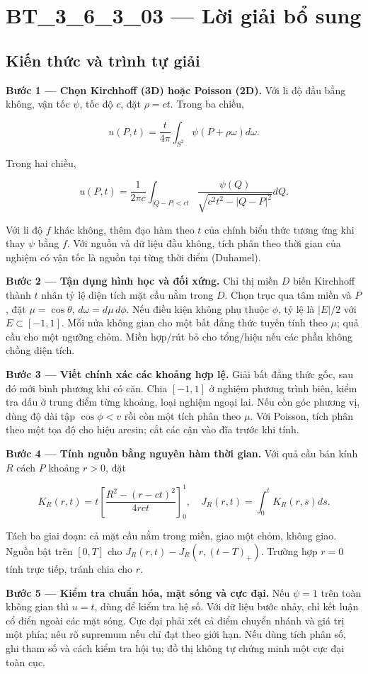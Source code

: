 \documentclass[10pt,a4paper]{article}
\begin{document}
\section*{BT\_3\_6\_3\_03 — Lời giải bổ sung}
\subsection*{Kiến thức và trình tự giải}
\textbf{Bước 1 — Chọn Kirchhoff (3D) hoặc Poisson (2D).} Với li độ đầu bằng không, vận tốc $\psi$, tốc độ $c$, đặt $\rho=ct$. Trong ba chiều,


\[
u(P,t)=\frac t{4\pi}\int_{S^2}\psi(P+\rho\omega)d\omega.
\]


Trong hai chiều,


\[
u(P,t)=\frac1{2\pi c}\int_{|Q-P|<ct}\frac{\psi(Q)}{\sqrt{c^2t^2-|Q-P|^2}}dQ.
\]


Với li độ $f$ khác không, thêm đạo hàm theo $t$ của chính biểu thức tương ứng khi thay $\psi$ bằng $f$. Với nguồn và dữ liệu đầu không, tích phân theo thời gian của nghiệm có vận tốc là nguồn tại từng thời điểm (Duhamel).

\textbf{Bước 2 — Tận dụng hình học và đối xứng.} Chỉ thị miền $D$ biến Kirchhoff thành $t$ nhân tỷ lệ diện tích mặt cầu nằm trong $D$. Chọn trục qua tâm miền và $P$, đặt $\mu=\cos\theta$, $d\omega=d\mu\,d\phi$. Nếu điều kiện không phụ thuộc $\phi$, tỷ lệ là $|E|/2$ với $E\subset[-1,1]$. Mỗi nửa không gian cho một bất đẳng thức tuyến tính theo $\mu$; quả cầu cho một ngưỡng chỏm. Miền hợp/rút bỏ cho tổng/hiệu nếu các phần không chồng diện tích.

\textbf{Bước 3 — Viết chính xác các khoảng hợp lệ.} Giải bất đẳng thức gốc, sau đó mới bình phương khi có căn. Chia $[-1,1]$ ở nghiệm phương trình biên, kiểm tra dấu ở trung điểm từng khoảng, loại nghiệm ngoại lai. Nếu còn góc phương vị, dùng độ dài tập $\cos\phi<v$ rồi còn một tích phân theo $\mu$. Với Poisson, tích phân theo một tọa độ cho hiệu arcsin; cắt các cận vào đĩa trước khi tính.

\textbf{Bước 4 — Tính nguồn bằng nguyên hàm thời gian.} Với quả cầu bán kính $R$ cách $P$ khoảng $r>0$, đặt


\[
K_R(r,t)=t\left[\frac{R^2-(r-ct)^2}{4rct}\right]_0^1,\quad J_R(r,t)=\int_0^tK_R(r,s)ds.
\]


Tách ba giai đoạn: cả mặt cầu nằm trong miền, giao một chỏm, không giao. Nguồn bật trên $[0,T]$ cho $J_R(r,t)-J_R(r,(t-T)_+)$. Trường hợp $r=0$ tính trực tiếp, tránh chia cho $r$.

\textbf{Bước 5 — Kiểm tra chuẩn hóa, mặt sóng và cực đại.} Nếu $\psi=1$ trên toàn không gian thì $u=t$, dùng để kiểm tra hệ số. Với dữ liệu bước nhảy, chỉ kết luận cổ điển ngoài các mặt sóng. Cực đại phải xét cả điểm chuyển nhánh và giá trị một phía; nêu rõ supremum nếu chỉ đạt theo giới hạn. Nếu dùng tích phân số, ghi tham số và cách kiểm tra hội tụ; đồ thị không tự chứng minh một cực đại toàn cục.
\end{document}
